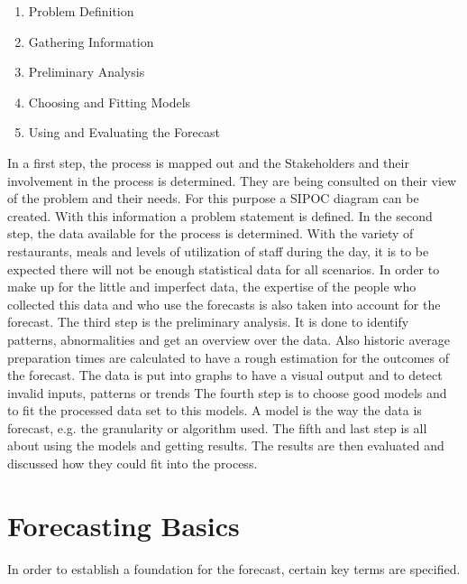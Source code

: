 \begin{enumerate}
\item Problem Definition
\item Gathering Information
\item Preliminary Analysis
\item Choosing and Fitting Models
\item Using and Evaluating the Forecast
\end{enumerate}

In a first step, the process is mapped out and the Stakeholders and their involvement in the process is determined. They are being consulted on their view of the problem and their needs. For this purpose a SIPOC diagram can be created. With this information a problem statement is defined.\newline
In the second step, the data available for the process is determined. With the variety of restaurants, meals and levels of utilization of staff during the day, it is to be expected there will not be enough statistical data for all scenarios. In order to make up for the little and imperfect data, the expertise of the people who collected this data and who use the forecasts is also taken into account for the forecast.\newline
The third step is the preliminary analysis. It is done to identify patterns, abnormalities and get an overview over the data. Also historic average preparation times are calculated to have a rough estimation for the outcomes of the forecast. The data is put into graphs to have a visual output and to detect invalid inputs, patterns or trends\newline
The fourth step is to choose good models and to fit the processed data set to this models. A model is the way the data is forecast, e.g. the granularity or algorithm used.\newline
The fifth and last step is all about using the models and getting results. The results are then evaluated and discussed how they could fit into the process.
\section{Forecasting Basics}\label{section:Forecast Basics}
In order to establish a foundation for the forecast, certain key terms are specified.
